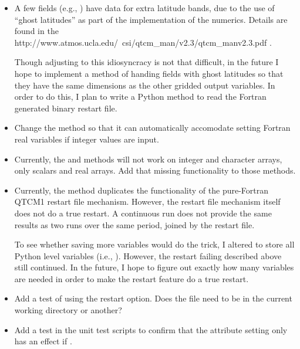 \begin{itemize}
\item A few fields (e.g., ) have data for extra latitude bands,
	due to the use of ``ghost latitudes'' as part of the
	implementation of the numerics.  Details are found in the 
%
{%
        {http://www.atmos.ucla.edu/~csi/qtcm_man/v2.3/qtcm_manv2.3.pdf}}
\cite{Neelin/etal:2002}.

	Though adjusting to this idiosyncracy is not that difficult, 
	in the future I hope to implement a method of handing
	fields with ghost latitudes so that they have the same
	dimensions as the other gridded output variables.  In order
	to do this, I plan to write a Python method to read the
	Fortran generated binary restart file.

\item Change the  method so that it can 
	automatically accomodate setting Fortran real variables
	if integer values are input.

\item Currently, the  and 
	 methods will not work
	on integer and character arrays, only scalars and real arrays.
	Add that missing functionality to those methods.

\item Currently, the  method duplicates the
	functionality of the pure-Fortran QTCM1 restart file mechanism.
	However, the restart file mechanism itself does not do a true
	restart.  A continuous run does not provide the same results
	as two runs over the same period, joined by the restart file.

	To see whether saving more variables would do the trick,
	I altered  to store all Python level
	variables (i.e., ).  However,
	the restart failing described above still continued.  In the
	future, I hope to figure out exactly how many variables are
	needed in order to make the restart feature do a true
	restart.

\item Add a test of using the 
	restart option.  Does the  file need to be
	in the current working directory or another?

\item Add a test in the unit test scripts to
	confirm that the 
	attribute setting only has an effect if 
	.


\end{itemize}
